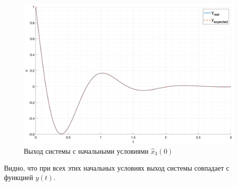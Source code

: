 \begin{figure}[ht!]
    \centering
    \includegraphics[width=\textwidth]{media/plots/task4_output_hat_3.png}
    \caption{Выход системы с начальными условиями $\hat{x}_3(0)$}
    \label{fig:task4_output__hat_3}
\end{figure}

Видно, что при всех этих начальных условиях выход системы совпадает с функцией $y(t)$.